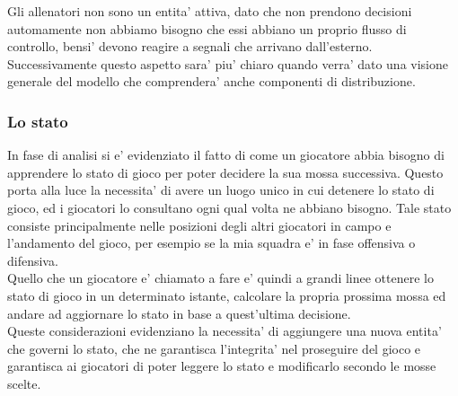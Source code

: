 Gli allenatori non sono un entita' attiva, dato che non prendono decisioni automamente non abbiamo bisogno che essi abbiano un proprio flusso di controllo, bensi' devono reagire a segnali che arrivano dall'esterno. Successivamente questo aspetto sara' piu' chiaro quando verra' dato una visione generale del modello che comprendera' anche componenti di distribuzione.

\subsubsection{Lo stato}
\label{sec:entita_coinvolte_stato}

In fase di analisi si e' evidenziato il fatto di come un giocatore abbia bisogno di apprendere lo stato di gioco per poter decidere la sua mossa successiva. Questo porta alla luce la necessita' di avere un luogo unico in cui detenere lo stato di gioco, ed i giocatori lo consultano ogni qual volta ne abbiano bisogno. Tale stato consiste principalmente nelle posizioni degli altri giocatori in campo e l'andamento del gioco, per esempio se la mia squadra e' in fase offensiva o difensiva.\\

Quello che un giocatore e' chiamato a fare e' quindi a grandi linee ottenere lo stato di gioco in un determinato istante, calcolare la propria prossima mossa ed andare ad aggiornare lo stato in base a quest'ultima decisione.\\

Queste considerazioni evidenziano la necessita' di aggiungere una nuova entita' che governi lo stato, che ne garantisca l'integrita' nel proseguire del gioco e garantisca ai giocatori di poter leggere lo stato e modificarlo secondo le mosse scelte.
